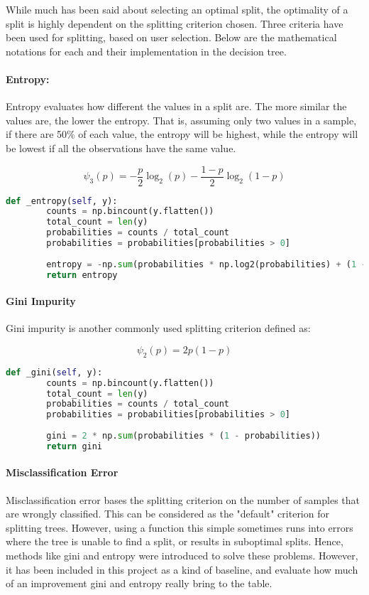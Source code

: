 \documentclass{article}
\begin{document}
While much has been said about selecting an optimal split, the optimality of a split is highly dependent on the splitting criterion chosen. Three criteria have been used for splitting, based on user selection.
Below are the mathematical notations for each and their implementation in the decision tree.

\paragraph{Entropy:}
Entropy evaluates how different the values in a split are. The more similar the values are, the lower the entropy. That is, assuming only two values in a sample, if there are 50\%  of each value, the entropy will be highest, while the entropy will be lowest if all the observations have the same value.

\[
\psi_3(p) = -\frac{p}{2} \log_2(p) - \frac{1-p}{2} \log_2(1-p)\] 
\cite{coursematerial}


\begin{lstlisting}[language=Python, caption=Entropy function]
    def _entropy(self, y):
        counts = np.bincount(y.flatten())
        total_count = len(y)
        probabilities = counts / total_count
        probabilities = probabilities[probabilities > 0]
        
        entropy = -np.sum(probabilities * np.log2(probabilities) + (1 - probabilities) * np.log2(1 - probabilities)) / 2
        return entropy
\end{lstlisting}

\paragraph{Gini Impurity}
Gini impurity is another commonly used splitting criterion defined as:

\[
\psi_2(p) = 2p(1 - p)
\]
\cite{coursematerial}

\begin{lstlisting}[language=Python, caption=Gini function]
    def _gini(self, y):
        counts = np.bincount(y.flatten())
        total_count = len(y)
        probabilities = counts / total_count
        probabilities = probabilities[probabilities > 0]
        
        gini = 2 * np.sum(probabilities * (1 - probabilities))
        return gini
\end{lstlisting}

\paragraph{Misclassification Error}
Misclassification error bases the splitting criterion on the number of samples that are wrongly classified. This can be considered as the "default" criterion for splitting trees. However, using a function this simple sometimes runs into errors where the tree is unable to find a split, or results in suboptimal splits. Hence, methods like gini and entropy were introduced to solve these problems. However, it has been included in this project as a kind of baseline, and evaluate how much of an improvement gini and entropy really bring to the table. 
\end{document}
